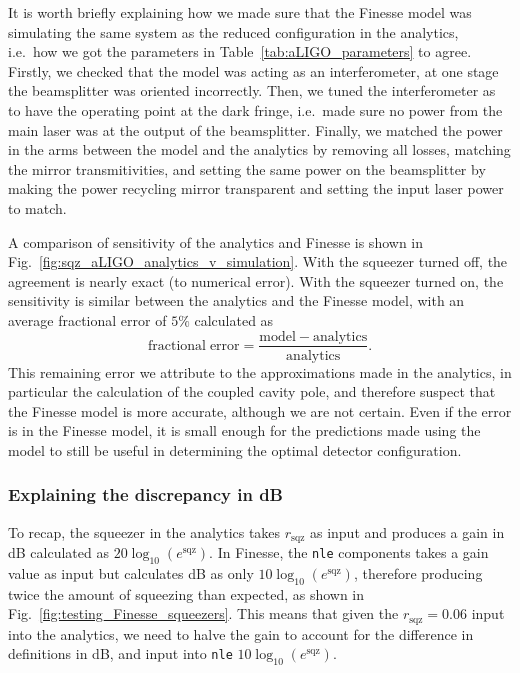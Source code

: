 \documentclass[aps,pra,superscriptaddress,reprint,nofootinbib]{revtex4-1}
\newcommand{\code}[1]{\texttt{#1}}
\begin{document}
It is worth briefly explaining how we made sure that the Finesse model was simulating the same system as the reduced configuration in the analytics, i.e.\ how we got the parameters in Table~\ref{tab:aLIGO_parameters} to agree. Firstly, we checked that the model was acting as an interferometer, at one stage the beamsplitter was oriented incorrectly. Then, we tuned the interferometer as to have the operating point at the dark fringe, i.e.\ made sure no power from the main laser was at the output of the beamsplitter. Finally, we matched the power in the arms between the model and the analytics by removing all losses, matching the mirror transmitivities, and setting the same power on the beamsplitter by making the power recycling mirror transparent and setting the input laser power to match.


A comparison of sensitivity of the analytics and Finesse is shown in Fig.~\ref{fig:sqz_aLIGO_analytics_v_simulation}. With the squeezer turned off, the agreement is nearly exact (to numerical error). With the squeezer turned on, the sensitivity is similar between the analytics and the Finesse model, with an average fractional error of $5\%$ calculated as $$\mathrm{fractional\; error} = \frac{\mathrm{model} - \mathrm{analytics}}{\mathrm{analytics}}.$$
This remaining error we attribute to the approximations made in the analytics, in particular the calculation of the coupled cavity pole, and therefore suspect that the Finesse model is more accurate, although we are not certain. Even if the error is in the Finesse model, it is small enough for the predictions made using the model to still be useful in determining the optimal detector configuration.


\subsubsection{Explaining the discrepancy in dB}

To recap, the squeezer in the analytics takes $r_\mathrm{sqz}$ as input and produces a gain in dB calculated as $20 \log_{10}(e^\mathrm{sqz})$. In Finesse, the \code{nle} components takes a gain value as input but calculates dB as only $10 \log_{10}(e^\mathrm{sqz})$, therefore producing twice the amount of squeezing than expected, as shown in Fig.~\ref{fig:testing_Finesse_squeezers}. This means that given the $r_\mathrm{sqz} = 0.06$ input into the analytics, we need to halve the gain to account for the difference in definitions in dB, and input into \code{nle} $10 \log_{10}(e^\mathrm{sqz})$.
\end{document}
